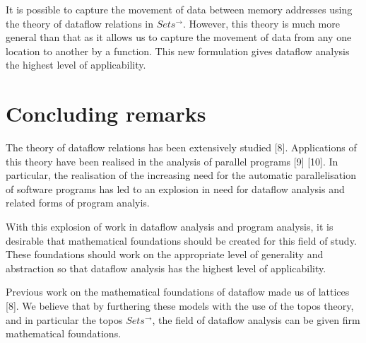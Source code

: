 \documentclass[a4paper,11pt, notitlepage]{report}
\theoremstyle{definition}
\begin{document}
It is possible to capture the movement of data between memory addresses using the theory of dataflow relations in $Sets^{\to}$. However, this theory is much more general than that as it allows us to capture the movement of data from any one location to another by a function. This new formulation gives dataflow analysis the highest level of applicability.
\newpage

\chapter{Concluding remarks}
The theory of dataflow relations has been extensively studied [8].  Applications of this theory have been realised in the analysis of parallel programs [9] [10]. In particular, the realisation of the increasing need for the automatic parallelisation of software programs has led to an explosion in need for dataflow analysis and related forms of program analyis.

With this explosion of work in dataflow analysis and program analysis, it is desirable that mathematical foundations should be created for this field of study. These foundations should work on the appropriate level of generality and abstraction so that dataflow analysis has the highest level of applicability.

Previous work on the mathematical foundations of dataflow made us of lattices [8]. We believe that by furthering these models with the use of the topos theory, and in particular the topos $Sets^{\to}$, the field of dataflow analysis can be given firm mathematical foundations.
\end{document}
